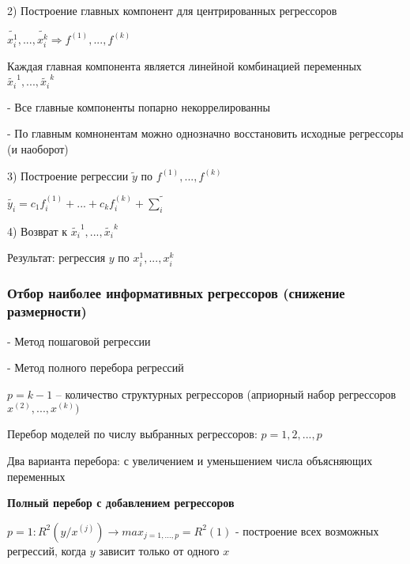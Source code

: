 \documentclass{article}
\begin{document}
\vspace{1mm}
2) Построение главных компонент для центрированных регрессоров \par
$\tilde{x_i^{1}}, ... , \tilde{x_i^{k}} \Longrightarrow f^{(1)}, ... , f^{(k)}$ \par
Каждая главная компонента является линейной комбинацией переменных $\tilde{x_i}^{1}, ... , \tilde{x_i}^{k}$\par
- Все главные компоненты попарно некоррелированны\par
- По главным комнонентам можно однозначно восстановить исходные регрессоры (и наоборот)\par

\vspace{1mm}
3) Построение регрессии $\tilde{y}$ по $f^{(1)}, ... , f^{(k)}$ \par
$\tilde{y_i} = c_1f_i^{(1)} + ... + c_kf_i^{(k)} + \tilde{\sum_i}$ \par

\vspace{1mm}
4) Возврат к $\tilde{x_i}^{1}, ... , \tilde{x_i}^{k}$\par
Результат: регрессия $y$ по $x_i^{1}, ... , x_i^{k}$

\subsubsection{Отбор наиболее информативных регрессоров (снижение размерности)}
- Метод пошаговой регрессии\par
- Метод полного перебора регрессий\par

\vspace{1mm}
$p = k - 1$ -- количество структурных регрессоров (априорный набор регрессоров $x^{(2)}, ... , x^{(k)})$ \par
Перебор моделей по числу выбранных регрессоров: $p = 1,2, ... , p$\par

\vspace{1mm}
Два варианта перебора: с увеличением и уменьшением числа объясняющих переменных\par

\vspace{2mm}
\textbf{Полный перебор с добавлением регрессоров} \par
$p = 1: R^2(y/x^{(j)}) \longrightarrow max_{j=1,...,p} = R^2(1)$ - построение всех возможных регрессий, когда $y$ зависит только от одного $x$ \par
\end{document}
